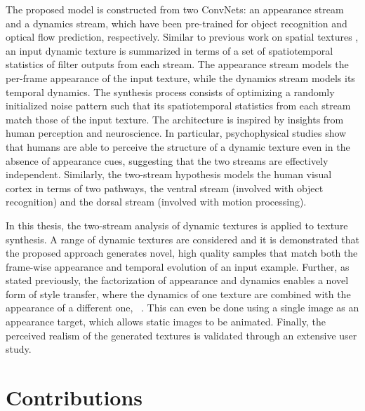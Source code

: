 The proposed model is constructed from two ConvNets: an appearance stream and a dynamics stream,
which have been pre-trained for object recognition
and optical flow prediction, respectively.
Similar to previous work on spatial textures
\cite{gatys2015,heeger1995pyramid,portilla2000parametric}, an input dynamic texture is summarized in terms of a set of
spatiotemporal statistics of filter outputs from each stream.
The appearance stream models the per-frame appearance of
the input texture, while the dynamics stream models its
temporal dynamics.
The synthesis process consists of optimizing a randomly initialized noise pattern such that its spatiotemporal statistics from
each stream match those of the input texture.
The architecture is inspired by insights from human perception and 
neuroscience.
In particular, psychophysical studies \cite{cutting1982} show that
humans are able to perceive the structure of a dynamic texture even
in the absence of appearance cues, suggesting that the two streams
are effectively independent.
Similarly, the two-stream hypothesis \cite{goodale1992} models the 
human visual cortex in terms of two pathways, the ventral stream
(involved with object recognition) and the
dorsal stream (involved with motion processing).

In this thesis, the two-stream analysis of
dynamic textures is applied to texture synthesis.
A range of dynamic textures are considered and it is demonstrated that the 
proposed approach generates novel, high quality samples that match
both the frame-wise appearance and temporal evolution of an input
example.
Further, as stated previously, the factorization of appearance and dynamics enables a 
novel form of style transfer, where the dynamics of one texture are 
combined with the appearance of a different one,
\cf\ \cite{gatys2016image}.
This can even be done using a single image as an appearance
target, which allows static images to be animated.
Finally, the perceived realism of the generated textures is validated
through an extensive user study.

\section{Contributions}

